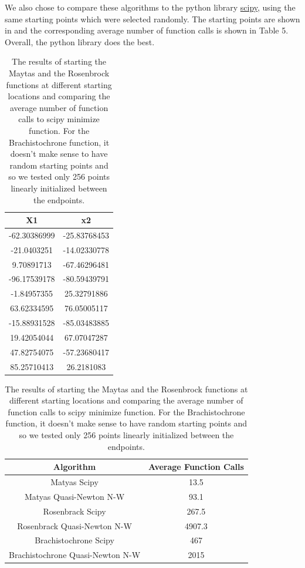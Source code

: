 \documentclass{article}
\begin{document}
We also chose to compare these algorithms to the python library \href{https://docs.scipy.org/doc/scipy/reference/generated/scipy.optimize.minimize.html}{scipy}, using the same starting points which were selected randomly. The starting points are shown in  and the corresponding average number of function calls is shown in Table 5. Overall, the python library does the best. 


\begin{table}
	\parbox{.3\linewidth}{
		\centering
		\caption{Uniform random starting points to test convergence.}
		\label{tab:start_pts}
		\begin{tabular}{c|c}
			\toprule
			X1 & x2 \\
			\midrule
			-62.30386999 & -25.83768453 \\
			-21.0403251 & -14.02330778 \\
			9.70891713 & -67.46296481 \\
			-96.17539178 & -80.59439791 \\
			-1.84957355 & 25.32791886 \\
			63.62334595 & 76.05005117 \\
			-15.88931528 & -85.03483885 \\
			19.42054044 & 67.07047287 \\
			47.82754075 & -57.23680417 \\
			85.25710413 & 26.2181083 \\
			\bottomrule
		\end{tabular}
	}
	\hfill
	\parbox{.65\linewidth}{
		\centering
		\label{tab:average_func_calls}
		\caption{The results of starting the Maytas and the Rosenbrock functions at different starting locations  and comparing the average number of function calls to scipy minimize function. For the Brachistochrone function, it doesn't make sense to have random starting points and so we tested only 256 points linearly initialized between the endpoints.}
		\begin{tabular}{c|c}
			\toprule
			Algorithm & Average Function Calls \\
			\midrule
			Matyas Scipy & 13.5 \\
			Matyas Quasi-Newton N-W & 93.1 \\
			Rosenbrack Scipy & 267.5 \\
			Rosenbrack Quasi-Newton N-W & 4907.3 \\
			Brachistochrone Scipy & 467 \\
			Brachistochrone Quasi-Newton N-W & 2015 \\
			\bottomrule
		\end{tabular}
	}
\end{table}
\end{document}

